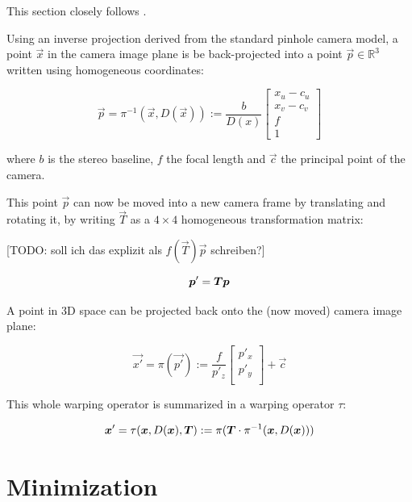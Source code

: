 This section closely follows \cite{omaridenseodometry}.

Using an inverse projection derived from the standard pinhole camera model, a
point $ \vec{x} $ in the camera image plane is be back-projected into a point
$ \vec{p} \in \mathbb{R}^3 $ written using homogeneous coordinates:

\begin{equation}
    \label{eq:backprojection}
    \vec{p} = \pi^{-1}(\vec{x}, D(\vec{x})) := \frac{b}{D(x)}
    \begin{bmatrix}
        x_u - c_u \\
        x_v - c_v \\
        f \\
        1
    \end{bmatrix}
\end{equation}

where $b$ is the stereo baseline, $f$ the focal length and $\vec{c}$ the principal point of the camera.

This point $\vec{p}$ can now be moved into a new camera frame by translating
and rotating it, by writing $\vec{T}$ as a $4 \times 4$ homogeneous
transformation matrix:

[TODO: soll ich das explizit als $f(\vec{T})\vec{p}$ schreiben?]

\begin{equation}
    \vec{p'} = \mat{T} \vec{p}
\end{equation}

A point in 3D space can be projected back onto the (now moved) camera image plane:

\begin{equation}
    \label{eq:projection}
    \vec{x'} = \pi(\vec{p'}) := \frac{f}{p'_z}
    \begin{bmatrix}
        p'_x \\
        p'_y \\
    \end{bmatrix}
    + \vec{c}
\end{equation}

This whole warping operator is summarized in a warping operator $\tau$:

\begin{equation}
    \vec{x'} = \tau(\vec{x}, D(\vec{x}), \vec{T}) := \pi( \mat{T} \cdot \pi^{-1} (\vec{x}, D(\vec{x})))
\end{equation}



\section{Minimization}


